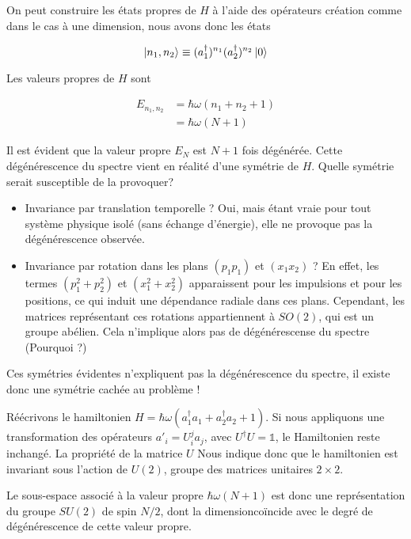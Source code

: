 \documentclass[11pt,twoside,a4paper]{report}
\numberwithin{equation}{part}
\begin{document}
On peut construire les états propres de $H$ à l'aide des opérateurs création comme dans le cas à une dimension, nous avons donc les états 

\begin{equation}
  \ket{n_1, n_2} \equiv (a_1^\dagger)^{n_1} (a_2^\dagger)^{n_2} \ket{0}
\end{equation}

Les valeurs propres de $H$ sont

\begin{align}
  E_{n_1, n_2} &= \hbar\omega(n_1 + n_2 + 1) \\
  &= \hbar\omega (N+1)
\end{align}

Il est évident que la valeur propre $E_N$ est $N+1$ fois dégénérée. Cette dégénérescence du spectre vient en réalité d'une symétrie de $H$. Quelle symétrie serait susceptible de la provoquer?

\begin{itemize}
    \item Invariance par translation temporelle ? Oui, mais étant vraie pour tout système physique isolé (sans échange d'énergie), elle ne provoque pas la dégénérescence observée.
    \item Invariance par rotation dans les plans $(p_1p_1)$ et $(x_1x_2)$ ? En effet, les termes $(p_1^2 + p_2^2)$ et $(x_1^2 + x_2^2)$ apparaissent pour les impulsions et pour les positions, ce qui induit une dépendance radiale dans ces plans. Cependant, les matrices représentant ces rotations appartiennent à $SO(2)$, qui est un groupe abélien. Cela n'implique alors pas de dégénérescense du spectre (Pourquoi ?)
\end{itemize}

Ces symétries évidentes n'expliquent pas la dégénérescence du spectre, il existe donc une symétrie cachée au problème !


Réécrivons le hamiltonien $H = \hbar\omega(a_1^\dagger a_1 + a_2^\dagger a_2 + 1)$. Si nous appliquons une transformation des opérateurs $a'_i = U_i^j a_j$, avec $U^\dagger U = \mathds{1}$, le Hamiltonien reste inchangé. La propriété de la matrice $U$ Nous indique donc que le hamiltonien est invariant sous l'action de $U(2)$, groupe des matrices unitaires $2\times 2$.

Le sous-espace associé à la valeur propre $\hbar\omega(N+1)$ est donc une représentation du groupe $SU(2)$ de spin $N/2$, dont la dimension\footnotemark coïncide avec le degré de dégénérescence de cette valeur propre.
\end{document}
